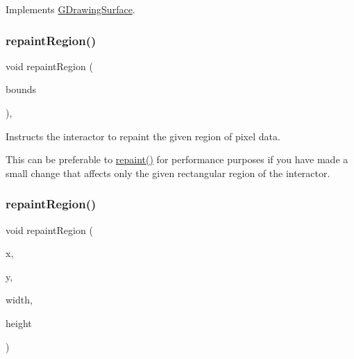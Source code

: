 Implements \mbox{\hyperlink{classGDrawingSurface_a4a8ae47b42f1e6a41b65d3546df46218}{G\+Drawing\+Surface}}.

\mbox{\label{classGDrawingSurface_a769c46fb3e1004aec76e8b0adfa42aa6}} 
\subsubsection{\texorpdfstring{repaint\+Region()}{repaintRegion()}\hspace{0.1cm}{\footnotesize\ttfamily [1/2]}}
{\footnotesize\ttfamily void repaint\+Region (\begin{DoxyParamCaption}\item[{const \mbox{\hyperlink{classGRectangle}{G\+Rectangle}} \&}]{bounds }\end{DoxyParamCaption})\hspace{0.3cm}{\ttfamily [virtual]}, {\ttfamily [inherited]}}



Instructs the interactor to repaint the given region of pixel data. 

This can be preferable to \mbox{\hyperlink{classGCanvas_ab93427f61c64e3db7f2637519aed1c00}{repaint()}} for performance purposes if you have made a small change that affects only the given rectangular region of the interactor. \mbox{\label{classGCanvas_a52152a764c4c4b092f826eee5d6554aa}} 
\subsubsection{\texorpdfstring{repaint\+Region()}{repaintRegion()}\hspace{0.1cm}{\footnotesize\ttfamily [2/2]}}
{\footnotesize\ttfamily void repaint\+Region (\begin{DoxyParamCaption}\item[{int}]{x,  }\item[{int}]{y,  }\item[{int}]{width,  }\item[{int}]{height }\end{DoxyParamCaption})\hspace{0.3cm}{\ttfamily [virtual]}}



